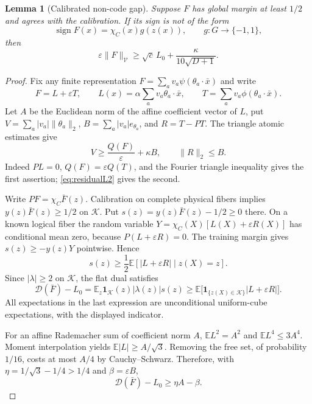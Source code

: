 \documentclass[11pt]{article}
\newtheorem{lemma}[theorem]{Lemma}
\newcommand{\E}{\mathbb E}
\newcommand{\one}{\mathbf 1}
\newcommand{\sgn}{\operatorname{sign}}
\newcommand{\cV}{\mathcal V}
\newcommand{\eps}{\varepsilon}
\begin{document}
\begin{lemma}[Calibrated non-code gap]\label{lem:offcode}
Suppose $F$ has global margin at least $1/2$ and agrees with the
calibration. If its sign is not of the form
\begin{equation}\label{eq:codesign}
 \sgn F(x)=\chi_C(x)g(z(x)),\qquad g:G\to\{-1,1\},
\end{equation}
then
\begin{equation}\label{eq:offcodegap}
 \eps\|F\|_{\cV}\ge\sqrt c\,L_0+
                         \frac{\kappa}{10\sqrt{D+1}}.
\end{equation}
\end{lemma}
\begin{proof}
Fix any finite representation $F=\sum_a v_a\psi(\theta_a\cdot\bar x)$
and write
\[
 F=L+\eps T,\qquad
 L(x)=\alpha\sum_a v_a\theta_a\cdot\bar x,
 \qquad T=\sum_a v_a\phi(\theta_a\cdot\bar x).
\]
Let $A$ be the Euclidean norm of the affine coefficient vector of $L$,
put $V=\sum_a|v_a|\|\theta_a\|_2$,
$B=\sum_a|v_a|e_{\theta_a}$, and $R=T-PT$.
The triangle atomic estimates give
\begin{equation}\label{eq:monotonebudget}
 V\ge\frac{Q(F)}\eps+\kappa B,
 \qquad \|R\|_2\le B.
\end{equation}
Indeed $PL=0$, $Q(F)=\eps Q(T)$, and the Fourier triangle inequality
gives the first assertion; \eqref{eq:residualL2} gives the second.

Write $PF=\chi_C\bar F(z)$. Calibration on complete physical fibers
implies $y(z)\bar F(z)\ge1/2$ on $\mathcal K$. Put
$s(z)=y(z)\bar F(z)-1/2\ge0$ there. On a known logical fiber the
random variable
$Y=\chi_C(X)[L(X)+\eps R(X)]$ has conditional mean zero, because
$P(L+\eps R)=0$. The training margin gives
$s(z)\ge-y(z)Y$ pointwise. Hence
\[
 s(z)\ge\frac12\E[|L+\eps R|\mid z(X)=z].
\]
Since $|\lambda|\ge2$ on $\mathcal K$, the flat dual satisfies
\begin{equation}\label{eq:dualslack}
 \mathcal D(\bar F)-L_0
  =\E_z\one_{\mathcal K}(z)|\lambda(z)|s(z)
  \ge\E\bigl[\one_{\{z(X)\in\mathcal K\}}|L+\eps R|\bigr].
\end{equation}
All expectations in the last expression are unconditional uniform-cube
expectations, with the displayed indicator.

For an affine Rademacher sum of coefficient norm $A$,
$\E L^2=A^2$ and $\E L^4\le3A^4$. Moment interpolation yields
$\E|L|\ge A/\sqrt3$. Removing the free set, of probability $1/16$,
costs at most $A/4$ by Cauchy--Schwarz. Therefore, with
$\eta=1/\sqrt3-1/4>1/4$ and $\beta=\eps B$,
\begin{equation}\label{eq:affinepenalty}
 \mathcal D(\bar F)-L_0\ge\eta A-\beta.
\end{equation}


\end{proof}
\end{document}
